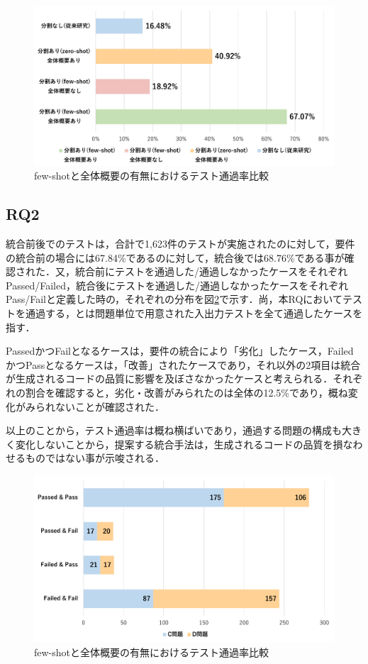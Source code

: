 \documentclass[submit,techrep,noauthor]{ipsj}
\begin{document}
\begin{figure}[t]
    \centering
    \includegraphics[width=1.0\linewidth]{./Toyoshima_fig/SIGSE_fig1.pdf}
    \caption{few-shotと全体概要の有無におけるテスト通過率比較}
    \label{ses2025}
\end{figure}

\subsection{RQ2}
統合前後でのテストは，合計で1,623件のテストが実施されたのに対して，要件の統合前の場合には67.84\%であるのに対して，統合後では68.76\%である事が確認された．又，統合前にテストを通過した/通過しなかったケースをそれぞれPassed/Failed，統合後にテストを通過した/通過しなかったケースをそれぞれPass/Failと定義した時の，それぞれの分布を図\ref{rq2_1}で示す．尚，本RQにおいてテストを通過する，とは問題単位で用意された入出力テストを全て通過したケースを指す．

PassedかつFailとなるケースは，要件の統合により「劣化」したケース，FailedかつPassとなるケースは，「改善」されたケースであり，それ以外の2項目は統合が生成されるコードの品質に影響を及ぼさなかったケースと考えられる．それぞれの割合を確認すると，劣化・改善がみられたのは全体の12.5\%であり，概ね変化がみられないことが確認された．

以上のことから，テスト通過率は概ね横ばいであり，通過する問題の構成も大きく変化しないことから，提案する統合手法は，生成されるコードの品質を損なわせるものではない事が示唆される．

\begin{figure}[t]
    \centering
    \includegraphics[width=1.0\linewidth]{./Toyoshima_fig/SIGSE_PF.pdf}
    \caption{few-shotと全体概要の有無におけるテスト通過率比較\protect\footnotemark}
    \label{rq2_1}
\end{figure}
\end{document}
